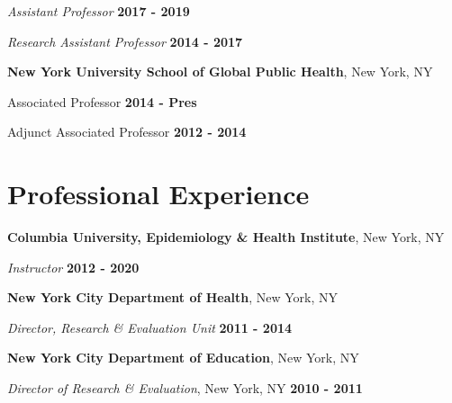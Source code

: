 \documentclass[margin,line]{res}
\newenvironment{list2}{
  \begin{list}{$\bullet$}{%
      \setlength{\itemsep}{0in}
      \setlength{\parsep}{0in} \setlength{\parskip}{0in}
      \setlength{\topsep}{0in} \setlength{\partopsep}{0in} 
      \setlength{\leftmargin}{0.2in}}}{\end{list}}
\begin{document}
\begin{resume}
\vspace{-.2cm}
{\em Assistant Professor} \hfill {\bf 2017 - 2019}

\vspace{-.2cm}
{\em Research Assistant Professor} \hfill {\bf 2014 - 2017}\\
\vspace{-.3cm}

{\bf New York University School of Global Public Health}, New York, NY

\vspace{-.3cm}
{Associated Professor} \hfill {\bf 2014 - Pres}

\vspace{-.3cm}
{Adjunct Associated Professor} \hfill {\bf 2012 - 2014}


\section{\sc Professional Experience}
{\bf Columbia University, Epidemiology \& Health Institute}, New York, NY

\vspace{-.3cm}
{\em Instructor} \hfill {\bf 2012 - 2020}\\
\vspace{-.3cm}

{\bf New York City Department of Health}, New York, NY

\vspace{-.3cm}
{\em Director, Research \& Evaluation Unit} \hfill {\bf 2011 - 2014}\\
\vspace{-.3cm}

{\bf New York City Department of Education}, New York, NY

\vspace{-.3cm}
{\em Director of Research \& Evaluation}, New York, NY \hfill {\bf 2010 - 2011}\\
\vspace{-.3cm}



\end{resume}
\end{document}
